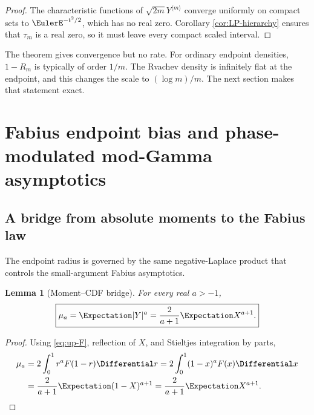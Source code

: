 \documentclass[11pt,oneside]{article}
\newtheorem{lemma}[theorem]{Lemma}
\theoremstyle{definition}
\theoremstyle{remark}
\newcommand{\Tower}[1]{Y^{\langle #1\rangle}}
\begin{document}
\begin{proof}
The characteristic functions of
$\sqrt{2m}\Tower{m}$ converge uniformly on compact sets to
$\EulerE^{-t^2/2}$, which has no real zero.  Corollary \ref{cor:LP-hierarchy}
ensures that $\tau_m$ is a real zero, so it must leave every compact scaled
interval.
\end{proof}

The theorem gives convergence but no rate.  For ordinary endpoint densities,
$1-R_m$ is typically of order $1/m$.  The Rvachev density is infinitely flat at
the endpoint, and this changes the scale to $(\log m)/m$.  The next section
makes that statement exact.

\section{Fabius endpoint bias and phase-modulated mod-Gamma asymptotics}
\label{sec:mod-gamma}

\subsection{A bridge from absolute moments to the Fabius law}

The endpoint radius is governed by the same negative-Laplace product that
controls the small-argument Fabius asymptotics.

\begin{lemma}[Moment--CDF bridge]
\label{lem:moment-bridge}
For every real $a>-1$,
\begin{equation}
 \boxed{
 \mu_a=\Expectation|Y|^a
 =\frac{2}{a+1}\Expectation X^{a+1}.}                         \label{eq:moment-CDF-bridge}
\end{equation}
\end{lemma}

\begin{proof}
Using \eqref{eq:up-F}, reflection of $X$, and Stieltjes integration by parts,
\begin{align*}
 \mu_a
 &=2\int_0^1r^aF(1-r)\Differential r
  =2\int_0^1(1-x)^aF(x)\Differential x\\
 &=\frac{2}{a+1}\Expectation(1-X)^{a+1}
  =\frac{2}{a+1}\Expectation X^{a+1}.
\end{align*}
\end{proof}
\end{document}
